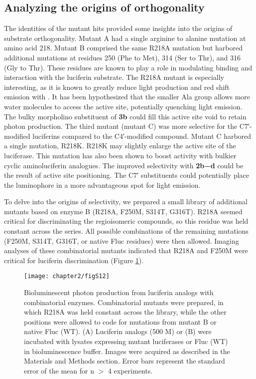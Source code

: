 \subsection*{Analyzing the origins of orthogonality}

The identities
of the mutant hits provided some insights into the origins of
substrate orthogonality. Mutant A had a single arginine to
alanine mutation at amino acid 218. Mutant B comprised the
same R218A mutation but harbored additional mutations at
residues 250 (Phe to Met), 314 (Ser to Thr), and 316 (Gly to
Thr). These residues are known to play a role in modulating
binding and interaction with the luciferin substrate. The R218A
mutant is especially interesting, as it is known to greatly reduce
light production and red shift emission with \dluciferin{}.\cite{BRANCHINI:2001gr} It has
been hypothesized that the smaller Ala group allows more
water molecules to access the active site, potentially quenching
light emission.\cite{BRANCHINI:2001gr} The bulky morpholino substituent of \textbf{3b} could
fill this active site void to retain photon production. The third
mutant (mutant C) was more selective for the C7′-modified
luciferins compared to the C4′-modified compound. Mutant C
harbored a single mutation, R218K. R218K may slightly enlarge
the active site of the luciferase. This mutation has also been
shown to boost activity with bulkier cyclic aminoluciferin
analogues.\cite{Harwood:2011gl} The improved selectivity with \textbf{2b−d} could be the
result of active site positioning. The C7′ substituents could
potentially place the luminophore in a more advantageous spot
for light emission.
\par
To delve into the origins of selectivity, we prepared a small
library of additional mutants based on enzyme B (R218A,
F250M, S314T, G316T). R218A seemed critical for discriminating
the regioisomeric compounds, so this residue was held
constant across the series. All possible combinations of the
remaining mutations (F250M, S314T, G316T, or native Fluc
residues) were then allowed. Imaging analyses of these
combinatorial mutants indicated that R218A and F250M
were critical for luciferin discrimination (Figure \ref{fig:muts_vs_cmpds}).
\begin{figure}[htbp]
\texttt{[image: chapter2/figS12]}
\centering
\caption[Bioluminescent photon production from luciferin analogs with combinatorial enzymes]{Bioluminescent photon production from luciferin analogs with combinatorial enzymes. Combinatorial mutants were prepared, in which R218A was held constant across the library, while the other positions were allowed to code for mutations from mutant B or native Fluc (WT). (A) Luciferin analogs (500 \textmu{}M) or (B) \dluciferin{} were incubated with lysates expressing mutant luciferases or Fluc (WT) in bioluminescence buffer. Images were acquired as described in the Materials and Methods section. Error bars represent the standard error of the mean for n $>$ 4 experiments.}
  \label{fig:muts_vs_cmpds}
\end{figure}
